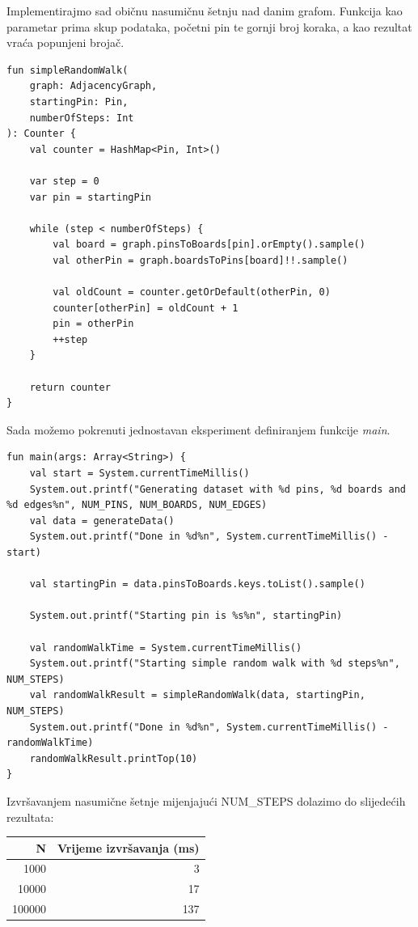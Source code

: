 \documentclass[times, utf8, seminar]{fer}
\begin{document}
Implementirajmo sad običnu nasumičnu šetnju nad danim grafom. Funkcija kao parametar prima skup podataka, početni pin te gornji broj koraka, a kao rezultat vraća popunjeni brojač.

\begin{lstlisting}
fun simpleRandomWalk(
	graph: AdjacencyGraph,
	startingPin: Pin,
	numberOfSteps: Int
): Counter {
    val counter = HashMap<Pin, Int>()

    var step = 0
    var pin = startingPin

    while (step < numberOfSteps) {
        val board = graph.pinsToBoards[pin].orEmpty().sample()
        val otherPin = graph.boardsToPins[board]!!.sample()

        val oldCount = counter.getOrDefault(otherPin, 0)
        counter[otherPin] = oldCount + 1
        pin = otherPin
        ++step
    }

    return counter
}
\end{lstlisting}

Sada možemo pokrenuti jednostavan eksperiment definiranjem funkcije \textit{main}.

\begin{lstlisting}
fun main(args: Array<String>) {
    val start = System.currentTimeMillis()
    System.out.printf("Generating dataset with %d pins, %d boards and %d edges%n", NUM_PINS, NUM_BOARDS, NUM_EDGES)
    val data = generateData()
    System.out.printf("Done in %d%n", System.currentTimeMillis() - start)

    val startingPin = data.pinsToBoards.keys.toList().sample()

    System.out.printf("Starting pin is %s%n", startingPin)

    val randomWalkTime = System.currentTimeMillis()
    System.out.printf("Starting simple random walk with %d steps%n", NUM_STEPS)
    val randomWalkResult = simpleRandomWalk(data, startingPin, NUM_STEPS)
    System.out.printf("Done in %d%n", System.currentTimeMillis() - randomWalkTime)
    randomWalkResult.printTop(10)
}
\end{lstlisting}

Izvršavanjem nasumične šetnje mijenjajući NUM\_STEPS dolazimo do slijedećih rezultata:

\begin{center}
		  \begin{tabular}{ |r|r| }
					 \hline
					 N & Vrijeme izvršavanja (ms) \\
					 \hline
					 1000 & 3 \\
					 \hline
					 10000 & 17 \\
					 \hline
					 100000 & 137 \\
					 \hline
		  \end{tabular}
\end{center}
\end{document}
